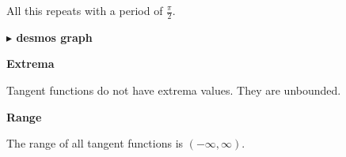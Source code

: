 \documentclass{ximera}
\begin{document}
\begin{example}
All this repeats with a period of $\frac{\pi}{2}$.












\textbf{\textcolor{blue!55!black}{$\blacktriangleright$ desmos graph}} 
\begin{center}
\end{center}






\textbf{\textcolor{blue!55!black}{Extrema}} 


Tangent functions do not have extrema values.  They are unbounded.




\textbf{\textcolor{blue!55!black}{Range}} 

The range of all tangent functions is $(-\infty, \infty)$.


\end{example}
\end{document}
